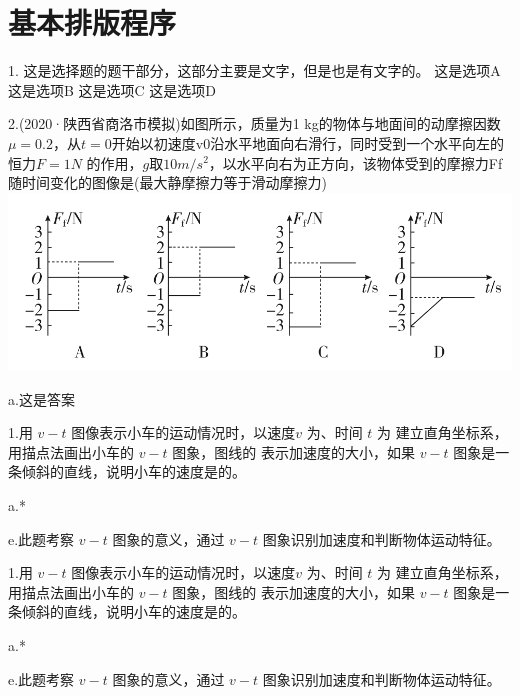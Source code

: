 \documentclass[a4paper,fontset = windows]{ctexbook}
\begin{document}
\chapter{基本排版程序}

\begin{choices}
   1. 这是选择题的题干部分，这部分主要是文字，但是也是有文字的。
   \choice[A] 这是选项A
   \choice[B] 这是选项B
   \choice[C] 这是选项C
   \choice[D] 这是选项D

   2.(2020·陕西省商洛市模拟)如图所示，质量为1 kg的物体与地面间的动摩擦因数$\mu =0.2$，从$ t=0$开始以初速度v0沿水平地面向右滑行，同时受到一个水平向左的恒力$ F=1 N$ 的作用，$ g$取$ 10 m/s^2$，以水平向右为正方向，该物体受到的摩擦力Ff随时间变化的图像是(最大静摩擦力等于滑动摩擦力)
   \choice[P] \includegraphics{1.png}

   a.这是答案

\end{choices}

 \begin{blanks}
  1.用 $v-t$ 图像表示小车的运动情况时，以速度$v$ 为、时间 $t$ 为 建立直角坐标系，用描点法画出小车的 $v-t$ 图象，图线的  表示加速度的大小，如果 $v-t$ 图象是一条倾斜的直线，说明小车的速度是的。
 
 a.*
 
 e.此题考察 $v-t$ 图象的意义，通过 $v-t$ 图象识别加速度和判断物体运动特征。
 
 \end{blanks}

 \begin{panduan}
  1.用 $v-t$ 图像表示小车的运动情况时，以速度$v$ 为、时间 $t$ 为 建立直角坐标系，用描点法画出小车的 $v-t$ 图象，图线的  表示加速度的大小，如果 $v-t$ 图象是一条倾斜的直线，说明小车的速度是的。
 
 a.*
 
 e.此题考察 $v-t$ 图象的意义，通过 $v-t$ 图象识别加速度和判断物体运动特征。

 \end{panduan}
\end{document}
